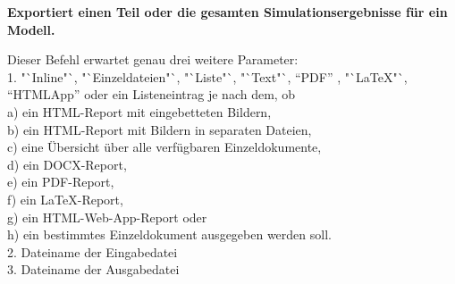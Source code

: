\textbf{Exportiert einen Teil oder die gesamten Simulationsergebnisse für ein Modell.}

Dieser Befehl erwartet genau drei weitere Parameter:\\
1. "`Inline"`, "`Einzeldateien"`, "`Liste"`, "`Text"`, "`PDF"' , "`LaTeX"`, "`HTMLApp"' oder ein Listeneintrag je nach dem, ob\\
a) ein HTML-Report mit eingebetteten Bildern,\\
b) ein HTML-Report mit Bildern in separaten Dateien,\\
c) eine Übersicht über alle verfügbaren Einzeldokumente,\\
d) ein DOCX-Report,\\
e) ein PDF-Report,\\
f) ein LaTeX-Report,\\
g) ein HTML-Web-App-Report oder\\
h) ein bestimmtes Einzeldokument ausgegeben werden soll.\\
2. Dateiname der Eingabedatei\\
3. Dateiname der Ausgabedatei

